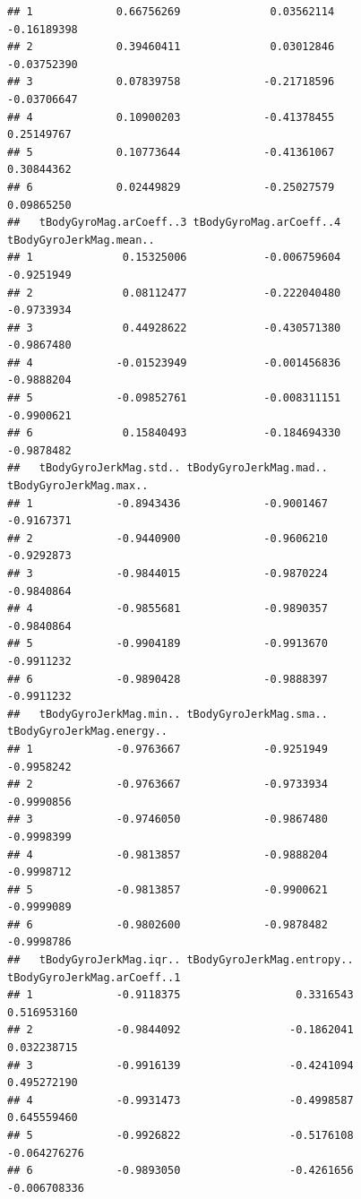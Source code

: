 \documentclass[
]{article}
\begin{document}
\begin{verbatim}
## 1             0.66756269              0.03562114             -0.16189398
## 2             0.39460411              0.03012846             -0.03752390
## 3             0.07839758             -0.21718596             -0.03706647
## 4             0.10900203             -0.41378455              0.25149767
## 5             0.10773644             -0.41361067              0.30844362
## 6             0.02449829             -0.25027579              0.09865250
##   tBodyGyroMag.arCoeff..3 tBodyGyroMag.arCoeff..4 tBodyGyroJerkMag.mean..
## 1              0.15325006            -0.006759604              -0.9251949
## 2              0.08112477            -0.222040480              -0.9733934
## 3              0.44928622            -0.430571380              -0.9867480
## 4             -0.01523949            -0.001456836              -0.9888204
## 5             -0.09852761            -0.008311151              -0.9900621
## 6              0.15840493            -0.184694330              -0.9878482
##   tBodyGyroJerkMag.std.. tBodyGyroJerkMag.mad.. tBodyGyroJerkMag.max..
## 1             -0.8943436             -0.9001467             -0.9167371
## 2             -0.9440900             -0.9606210             -0.9292873
## 3             -0.9844015             -0.9870224             -0.9840864
## 4             -0.9855681             -0.9890357             -0.9840864
## 5             -0.9904189             -0.9913670             -0.9911232
## 6             -0.9890428             -0.9888397             -0.9911232
##   tBodyGyroJerkMag.min.. tBodyGyroJerkMag.sma.. tBodyGyroJerkMag.energy..
## 1             -0.9763667             -0.9251949                -0.9958242
## 2             -0.9763667             -0.9733934                -0.9990856
## 3             -0.9746050             -0.9867480                -0.9998399
## 4             -0.9813857             -0.9888204                -0.9998712
## 5             -0.9813857             -0.9900621                -0.9999089
## 6             -0.9802600             -0.9878482                -0.9998786
##   tBodyGyroJerkMag.iqr.. tBodyGyroJerkMag.entropy.. tBodyGyroJerkMag.arCoeff..1
## 1             -0.9118375                  0.3316543                 0.516953160
## 2             -0.9844092                 -0.1862041                 0.032238715
## 3             -0.9916139                 -0.4241094                 0.495272190
## 4             -0.9931473                 -0.4998587                 0.645559460
## 5             -0.9926822                 -0.5176108                -0.064276276
## 6             -0.9893050                 -0.4261656                -0.006708336

\end{verbatim}
\end{document}
